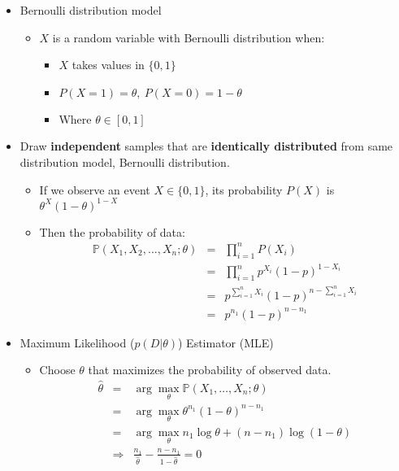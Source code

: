 \documentclass[letterpaper,10pt]{article}
\begin{document}
\begin{itemize}
	\item Bernoulli distribution model
	\begin{itemize}
		\item $X$ is a random variable with Bernoulli distribution when:
		\begin{itemize}
			\item $X$ takes values in $\{0,1\}$
			\item $P(X=1)=\theta,~P(X=0)=1-\theta$
			\item Where $\theta\in[0,1]$
		\end{itemize}
	\end{itemize}
	\item Draw \textbf{independent} samples that are \textbf{identically distributed} from same distribution model, Bernoulli distribution.
	\begin{itemize}
		\item If we observe an event $X\in\{0,1\}$, its probability $P(X)$ is $\theta^X(1-\theta)^{1-X}$
		\item Then the probability of data:
		\begin{equation}
		\begin{array}{rcl}
			\mathbb{P}(X_1,X_2,...,X_n;\theta) & = & \prod_{i=1}^{n}{P(X_i)} \\
											   & = & \prod_{i=1}^{n}{p^{X_i}(1-p)^{1-X_i}} \\
											   & = & p^{\sum_{i=1}^{n}{X_i}}(1-p)^{n-\sum_{i=1}^{n}{X_i}} \\
											   & = & p^{n_1}(1-p)^{n-n_1}
		\end{array}
		\end{equation}
	\end{itemize}
	\item Maximum Likelihood ($p(D|\theta)$) Estimator (MLE)
	\begin{itemize}
		\item Choose $\theta$ that maximizes the probability of observed data.
		\begin{equation}
		\begin{array}{rcl}
		\hat{\theta} & = & \arg\max_\theta{\mathbb{P}(X_1,\dots,X_n;\theta)} \\
					 & = & \arg\max_\theta{\theta^{n_1}(1-\theta)^{n-n_1}} \\
					 & = & \arg\max_\theta{n_1\log\theta+(n-n_1)\log(1-\theta)}\\
					 & \Rightarrow & \frac{n_1}{\hat{\theta}}-\frac{n-n_1}{1-\hat{\theta}} = 0 \\

\end{array}
\end{equation}
\end{itemize}
\end{itemize}
\end{document}
